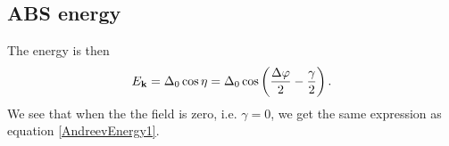 \subsection{ABS energy}
The energy is then 
\begin{equation}
E_{\mathbf{k}} = \Delta_0 \cos \eta = \Delta_0\cos\left(\frac{\Delta\varphi}{2} -\frac{\gamma}{2}\right).
\label{AndreevEnergy3}
\end{equation}
We see that when the the field is zero, i.e. $\gamma = 0$, we get the same expression as equation \eqref{AndreevEnergy1}. 

\begin{comment}

\section{ABS energies with barriers and applied field}
By using the same approach as in section \ref{sec:EwithBarriers}, but with the modified wave-vectors that include magnetic field we may find the ABS energies for the case where we have both barriers and applied field. 
\subsection{Boundary conditions}
We will have the same boundary conditions as in equations \eqref{BC1-BC3}. With the wavevector and its derivative given as 
\begin{equation}
\begin{split}
    \Psi_k^{\pm}(x)&=
    \begin{pmatrix}
        \vec{u}_k \\ \vec{v}_k
    \end{pmatrix}    
    e^{i(k^{\pm}x\mp ef(x)/\hbar)}\\
    \frac{\partial \Psi_k^{\pm}(x)}{\partial x} &=
    i\left(k^{\pm} \mp \frac{e}{\hbar}\frac{\partial f}{\partial x}\right)\Psi_k^{\pm}(x) = i\left(k^{\pm} \pm\frac{e}{\hbar}A(x)\right)\Psi_k^{\pm}(x)
\end{split}
\end{equation}
\end{comment}
